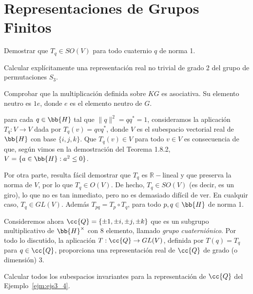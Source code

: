 \newpage
\section{Representaciones de Grupos Finitos}

\begin{ejerciciostar}
    Demostrar que $T_q\in SO(V)$ para todo cuaternio $q$ de norma 1.
\end{ejerciciostar}

\begin{ejerciciostar}\label{ej:3_2}
    Calcular explícitamente una representación real no trivial de grado 2 del grupo de permutaciones $S_3$.
\end{ejerciciostar}

\begin{ejercicio}
    Comprobar que la multiplicación definida sobre $KG$ es asociativa. Su elemento neutro es $1e$, donde $e$ es el elemento neutro de $G$.
\end{ejercicio}

\begin{ejemplo}\label{ejm:ejs3_4}
    para cada $q\in \bb{H}$ tal que $\|q\|^2 = qq^\ast = 1$, consideramos la aplicación $T_q:V\to V$ dada por $T_q(v) = qvq^\ast$, donde $V$ es el subespacio vectorial real de $\bb{H}$ con base $\{i,j,k\}$. Que $T_q(v)\in V$ para todo $v\in V$ es consecuencia de que, según vimos en la demostración del Teorema 1.8.2, $V = \{a\in \bb{H}: a^2 \leq 0\}$.

    Por otra parte, resulta fácil demostrar que $T_q$ es $\mathbb{R}-$lineal y que preserva la norma de $V$, por lo que $T_q\in O(V)$. De hecho, $T_q\in SO(V)$ (es decir, es un giro), lo que no es tan inmediato, pero no es demasiado difícil de ver. En cualquir caso, $T_q\in GL(V)$. Además $T_{pq} = T_p\circ T_q$, para todo $p,q\in \bb{H}$ de norma 1.

    Consideremos ahora $\cc{Q}=\{\pm 1, \pm i, \pm j, \pm k\}$ que es un subgrupo multiplicativo de $\bb{H}^\times$ con 8 elemento, llamado \textit{grupo cuaterniónico}. Por todo lo discutido, la aplicación $T:\cc{Q}\to GL(V)$, definida por $T(q)= T_q$ para $q\in \cc{Q}$, proporciona una representación real de $\cc{Q}$ de grado (o dimensión) 3.
\end{ejemplo}

\begin{ejercicio}
    Calcular todos los subespacios invariantes para la representación de $\cc{Q}$ del Ejemplo~\ref{ejm:ejs3_4}.
\end{ejercicio}


